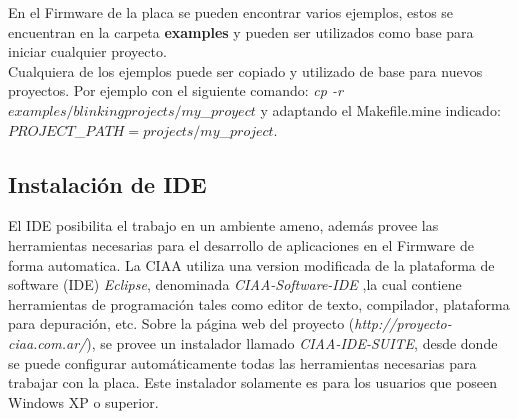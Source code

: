 \documentclass[12pt,letterpaper]{article}
\begin{document}
En el Firmware de la placa se pueden encontrar varios ejemplos, estos se encuentran en la carpeta \textbf{examples} y pueden ser utilizados como base para iniciar cualquier proyecto.
 \\
 
Cualquiera de los ejemplos puede ser copiado y utilizado de base para nuevos proyectos. Por ejemplo con el siguiente comando:	\textit{cp -r $examples/blinking projects/my$\_$proyect$} y adaptando el Makefile.mine indicado: $PROJECT$\_$PATH = projects/my$\_$project$.
\subsection{Instalación de IDE}
El IDE posibilita el trabajo en un ambiente ameno, además provee las herramientas necesarias para el desarrollo de aplicaciones en el Firmware de forma automatica. La CIAA utiliza una version modificada de la plataforma de software (IDE)  \textit{Eclipse}, denominada \textit{CIAA-Software-IDE} ,la cual contiene herramientas de programación tales como editor de texto, compilador, plataforma para depuración, etc.
Sobre la página web del proyecto (\textit{http://proyecto-ciaa.com.ar/}), se provee un instalador llamado \textit{CIAA-IDE-SUITE}, desde donde se puede configurar automáticamente todas las herramientas necesarias para trabajar con la placa. Este instalador solamente es para los usuarios que poseen Windows XP o superior.
 \\
\end{document}
